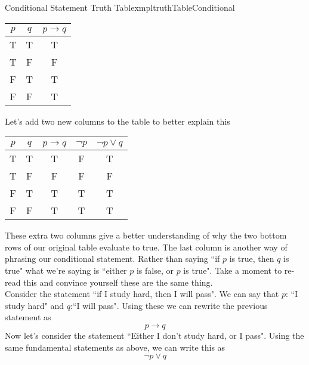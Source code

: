 \begin{exmpl}[label={exmpl:truthTableConditional}]{Conditional Statement Truth Table}{xmpltruthTableConditional}
    \begin{center}
        \begin{tabular}{|c|c|c|}
            \hline
            $p$ & $q$ & $p \to q$ \\
            \hline
            T   & T   & T         \\
            \hline
            T   & F   & F         \\
            \hline
            F   & T   & T         \\
            \hline
            F   & F   & T         \\
            \hline
        \end{tabular}
    \end{center}
    \vspace{0.5cm}
    Let's add two new columns to the table to better explain this
    \begin{center}
        \begin{tabular}{|c|c|c|c|c|}
            \hline
            $p$ & $q$ & $p \to q$ & $\lnot p$ & $\lnot p \lor q$ \\
            \hline
            T   & T   & T         & F         & T                \\
            \hline
            T   & F   & F         & F         & F                \\
            \hline
            F   & T   & T         & T         & T                \\
            \hline
            F   & F   & T         & T         & T                \\
            \hline
        \end{tabular}
    \end{center}
    \vspace{0.5cm}
    These extra two columns give a better understanding of why the two bottom rows of our original table evaluate to true. The last column is another way of phrasing our conditional statement. Rather than saying ``if $p$ is true, then $q$ is true" what we're saying is ``either $p$ is false, or $p$ is true". Take a moment to re-read this and convince yourself these are the same thing.\\

    Consider the statement ``if I study hard, then I will pass". We can say that $p$: ``I study hard" and $q$:``I will pass". Using these we can rewrite the previous statement as
    $$p \to q$$
    Now let's consider the statement ``Either I don't study hard, or I pass". Using the same fundamental statements as above, we can write this as
    $$\lnot p \lor q$$
\end{exmpl}

